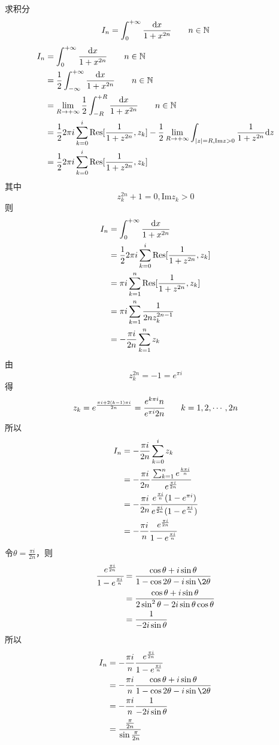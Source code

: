 \begin{homeworkProblem}
    求积分
    \[
    I_{n} = \int_0^{+\infty}\frac{\mathrm{d}x}{1+x^{2n}}\qquad n\in\mathbb{N}
    \]
\solution
\[\begin{split}
I_{n} &= \int_0^{+\infty}\frac{\mathrm{d}x}{1+x^{2n}}\qquad n\in\mathbb{N}\\
&= \frac{1}{2}\int_{-\infty}^{+\infty}\frac{\mathrm{d}x}{1+x^{2n}}\qquad n\in\mathbb{N}\\
&= \lim_{R\rightarrow+\infty}\frac{1}{2}\int_{-R}^{+R}\frac{\mathrm{d}x}{1+x^{2n}}\qquad n\in\mathbb{N}\\
&= \frac{1}{2}2\pi i\sum_{k=0}^{i}\mathrm{Res}[\frac{1}{1+z^{2n}}, z_k] - \frac{1}{2}\lim_{R\rightarrow+\infty}\int_{|z|=R, \mathrm{Im}z>0}\frac{1}{1+z^{2n}}\mathrm{d}z\\
&=\frac{1}{2}2\pi i\sum_{k=0}^{i}\mathrm{Res}[\frac{1}{1+z^{2n}}, z_k]
\end{split}\]
其中
\[z_k^{2n}+1=0, \mathrm{Im}z_k>0\]
则
\[\begin{split}
I_n &= \int_0^{+\infty}\frac{\mathrm{d}x}{1+x^{2n}}\\
&= \frac{1}{2}2\pi i\sum_{k=0}^{i}\mathrm{Res}[\frac{1}{1+z^{2n}}, z_k] \\
&= \pi i\sum_{k=1}^{n}\mathrm{Res}[\frac{1}{1+z^{2n}}, z_k]\\
&= \pi i\sum_{k=1}^{n}\frac{1}{2nz_k^{2n-1}}\\
&= -\frac{\pi i}{2n}\sum_{k=1}^{n}z_k
\end{split}\]
由\[z_k^{2n}=-1=e^{\pi i}\]得\[z_k=e^\frac{\pi i+2(k-1)\pi i}{2n}=\cfrac{e^{k\pi i}{n}}{e^{\pi i}{2n}} \qquad k=1,2,\cdots,2n\]
所以
\[\begin{split}
I_n &= -\frac{\pi i}{2n}\sum_{k=0}^{i}z_k \\
&= -\frac{\pi i}{2n}\cfrac{\sum_{k=1}^{n}e^{\frac{k\pi i}{n}}}{e^{\frac{\pi i}{2n}}}\\
&= -\frac{\pi i}{2n}\cfrac{e^{\frac{\pi i}{n}}(1-e^{\pi i})}{e^{\frac{\pi i}{2n}}(1-e^{\frac{\pi i}{n}})}\\
&=-\frac{\pi i}{n}\cfrac{e^{\frac{\pi i}{2n}}}{1-e^{\frac{\pi i}{n}}}
\end{split}\]
令$\theta=\frac{\pi i}{2n}$，则
\[\begin{split}
\cfrac{e^{\frac{\pi i}{2n}}}{1-e^{\frac{\pi i}{n}}}
&= \frac{\cos\theta + i\sin\theta}{1-\cos2\theta-i\sin\2\theta}\\
&= \frac{\cos\theta + i\sin\theta}{2\sin^2\theta-2i\sin\theta\cos\theta}\\
&= \frac{1}{-2i\sin\theta}
\end{split}\]
所以
\[\begin{split}
I_n &= -\frac{\pi i}{n}\cfrac{e^{\frac{\pi i}{2n}}}{1-e^{\frac{\pi i}{n}}}\\
&= -\frac{\pi i}{n}\frac{\cos\theta + i\sin\theta}{1-\cos2\theta-i\sin\2\theta}\\
&=-\frac{\pi i}{n}\frac{1}{-2i\sin\theta}\\
&= \cfrac{\frac{\pi}{2n}}{\sin\frac{\pi}{2n}}
\end{split}\]
\end{homeworkProblem}
